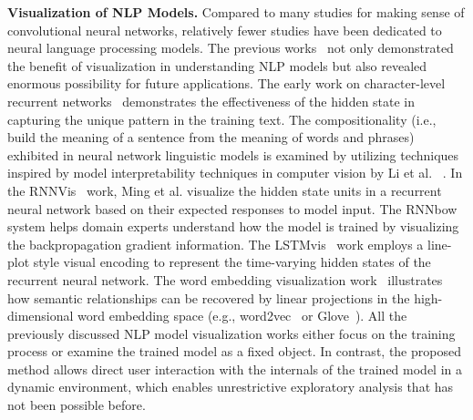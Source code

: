 \textbf{Visualization of NLP Models.}
Compared to many studies for making sense of convolutional neural networks, relatively fewer studies have been dedicated to neural language processing models.
%
The previous works~\cite{KarpathyJohnson2015, LiChenHovy2015, StrobeltGehrmannPfister2018, LiuBremerJayaraman2018} not only demonstrated the benefit of visualization in understanding NLP models but also revealed enormous possibility for future applications.
The early work on character-level recurrent networks~\cite{KarpathyJohnson2015} demonstrates the effectiveness of the hidden state in capturing the unique pattern in the training text. The compositionality (i.e., build the meaning of a sentence from the meaning of words and phrases) exhibited in neural network linguistic models is examined by utilizing techniques inspired by model interpretability techniques in computer vision by Li et al. ~\cite{LiChenHovy2015}.
In the RNNVis~\cite{MingCaoZhang2017} work, Ming et al. visualize the hidden state units in a recurrent neural network based on their expected responses to model input.
The RNNbow~\cite{CashmanPattersonMosca2017} system helps domain experts understand how the model is trained by visualizing the backpropagation gradient information.
The LSTMvis~\cite{StrobeltGehrmannPfister2018} work employs a line-plot style visual encoding to represent the time-varying hidden states of the recurrent neural network. The word embedding visualization work~\cite{LiuBremerJayaraman2018} illustrates how semantic relationships can be recovered by linear projections in the high-dimensional word embedding space (e.g., word2vec~\cite{MikolovSutskeverChen2013} or Glove~\cite{PenningtonSocherManning2014}).
%
All the previously discussed NLP model visualization works either focus on the training process or examine the trained model as a fixed object. In contrast, the proposed method allows direct user interaction with the internals of the trained model in a dynamic environment, which enables unrestrictive exploratory analysis that has not been possible before.

